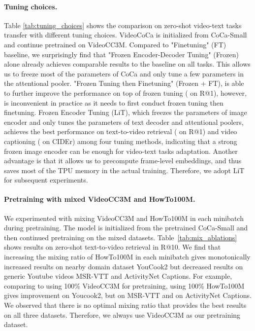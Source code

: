 \paragraph{Tuning choices.}
\label{sec:experiments_tuning_ablation}
Table \ref{tab:tuning_choices} shows the comparison on zero-shot video-text tasks transfer with different tuning choices. VideoCoCa is initialized from CoCa-Small and continue pretrained on VideoCC3M. Compared to "Finetuning" (FT) baseline, we surprisingly find that "Frozen Encoder-Decoder  Tuning"  (Frozen) alone already achieves comparable results to the baseline on all tasks. This allows us to freeze most of the parameters of CoCa and only tune a few parameters in the attentional pooler. "Frozen Tuning then Finetuning" (Frozen + FT), is able to further improve the performance on top of frozen tuning ( on R@1), however, is inconvenient in practice as it needs to first conduct frozen tuning then finetuning. Frozen Encoder Tuning (LiT), which freezes the parameters of image encoder and only tunes the parameters of text decoder and attentional poolers, achieves the best performance on text-to-video retrieval ( on R@1) and video captioning ( on CIDEr) among four tuning methods, indicating that a strong frozen image encoder can be enough for video-text tasks adaptation. Another advantage is that it allows us to precompute frame-level embeddings, and thus saves most of the TPU memory in the actual training. Therefore, we adopt LiT for subsequent experiments.





\vspace{-2mm}
\paragraph{Pretraining with mixed VideoCC3M and HowTo100M.}
\label{sec: mixed_ht_hc}
We experimented with mixing VideoCC3M and HowTo100M in each minibatch during pretraining. The model is initialized from the pretrained CoCa-Small and then continued pretraining on the mixed datasets. Table~\ref{tab:mix_ablations} shows results on zero-shot text-to-video retrieval in R@10. We find that increasing the mixing ratio of HowTo100M in each minibatch gives monotonically increased results on nearby domain dataset YouCook2 but decreased results on generic Youtube videos MSR-VTT and ActivityNet Captions. For example, comparing to using 100\% VideoCC3M for pretraining, using 100\% HowTo100M gives  improvement on Youcook2, but  on MSR-VTT and  on ActivityNet Captions. We observed that there is no optimal mixing ratio that provides the best results on all three datasets. Therefore, we always use VideoCC3M as our pretraining dataset.

